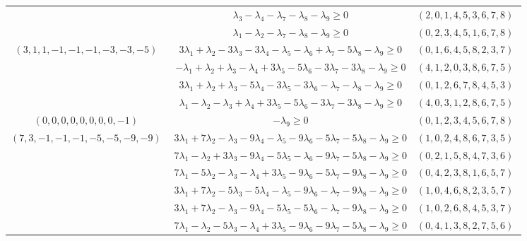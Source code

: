 \documentclass[12pt]{article}
\begin{document}
\begin{longtable}[l]{|c|c|c|}
 & $\lambda_{3}-\lambda_{4}-\lambda_{7}-\lambda_{8}-\lambda_{9}\geq 0$ & $(2 ,0 ,1 ,4 ,5 ,3 ,6 ,7 ,8) \;$\\ 
 \cline{2-3} 
 & $\lambda_{1}-\lambda_{2}-\lambda_{7}-\lambda_{8}-\lambda_{9}\geq 0$ & $(0 ,2 ,3 ,4 ,5 ,1 ,6 ,7 ,8) \;$\\ \hline\multirow{4}{*}{ $(3 ,1 ,1 ,-1 ,-1 ,-1 ,-3 ,-3 ,-5) \;$ }  & $3\lambda_{1} + \lambda_{2}-3\lambda_{3}-3\lambda_{4}-\lambda_{5}-\lambda_{6} + \lambda_{7}-5\lambda_{8}-\lambda_{9}\geq 0$ & $(0 ,1 ,6 ,4 ,5 ,8 ,2 ,3 ,7) \;$\\ 
 \cline{2-3} 
 & $-\lambda_{1} + \lambda_{2} + \lambda_{3}-\lambda_{4} + 3\lambda_{5}-5\lambda_{6}-3\lambda_{7}-3\lambda_{8}-\lambda_{9}\geq 0$ & $(4 ,1 ,2 ,0 ,3 ,8 ,6 ,7 ,5) \;$\\ 
 \cline{2-3} 
 & $3\lambda_{1} + \lambda_{2} + \lambda_{3}-5\lambda_{4}-3\lambda_{5}-3\lambda_{6}-\lambda_{7}-\lambda_{8}-\lambda_{9}\geq 0$ & $(0 ,1 ,2 ,6 ,7 ,8 ,4 ,5 ,3) \;$\\ 
 \cline{2-3} 
 & $\lambda_{1}-\lambda_{2}-\lambda_{3} + \lambda_{4} + 3\lambda_{5}-5\lambda_{6}-3\lambda_{7}-3\lambda_{8}-\lambda_{9}\geq 0$ & $(4 ,0 ,3 ,1 ,2 ,8 ,6 ,7 ,5) \;$\\ \hline\multirow{1}{*}{ $(0 ,0 ,0 ,0 ,0 ,0 ,0 ,0 ,-1) \;$ }  & $-\lambda_{9}\geq 0$ & $(0 ,1 ,2 ,3 ,4 ,5 ,6 ,7 ,8) \;$\\ \hline\multirow{7}{*}{ $(7 ,3 ,-1 ,-1 ,-1 ,-5 ,-5 ,-9 ,-9) \;$ }  & $3\lambda_{1} + 7\lambda_{2}-\lambda_{3}-9\lambda_{4}-\lambda_{5}-9\lambda_{6}-5\lambda_{7}-5\lambda_{8}-\lambda_{9}\geq 0$ & $(1 ,0 ,2 ,4 ,8 ,6 ,7 ,3 ,5) \;$\\ 
 \cline{2-3} 
 & $7\lambda_{1}-\lambda_{2} + 3\lambda_{3}-9\lambda_{4}-5\lambda_{5}-\lambda_{6}-9\lambda_{7}-5\lambda_{8}-\lambda_{9}\geq 0$ & $(0 ,2 ,1 ,5 ,8 ,4 ,7 ,3 ,6) \;$\\ 
 \cline{2-3} 
 & $7\lambda_{1}-5\lambda_{2}-\lambda_{3}-\lambda_{4} + 3\lambda_{5}-9\lambda_{6}-5\lambda_{7}-9\lambda_{8}-\lambda_{9}\geq 0$ & $(0 ,4 ,2 ,3 ,8 ,1 ,6 ,5 ,7) \;$\\ 
 \cline{2-3} 
 & $3\lambda_{1} + 7\lambda_{2}-5\lambda_{3}-5\lambda_{4}-\lambda_{5}-9\lambda_{6}-\lambda_{7}-9\lambda_{8}-\lambda_{9}\geq 0$ & $(1 ,0 ,4 ,6 ,8 ,2 ,3 ,5 ,7) \;$\\ 
 \cline{2-3} 
 & $3\lambda_{1} + 7\lambda_{2}-\lambda_{3}-9\lambda_{4}-5\lambda_{5}-5\lambda_{6}-\lambda_{7}-9\lambda_{8}-\lambda_{9}\geq 0$ & $(1 ,0 ,2 ,6 ,8 ,4 ,5 ,3 ,7) \;$\\ 
 \cline{2-3} 
 & $7\lambda_{1}-\lambda_{2}-5\lambda_{3}-\lambda_{4} + 3\lambda_{5}-9\lambda_{6}-9\lambda_{7}-5\lambda_{8}-\lambda_{9}\geq 0$ & $(0 ,4 ,1 ,3 ,8 ,2 ,7 ,5 ,6) \;$\\ 

\end{longtable}
\end{document}
